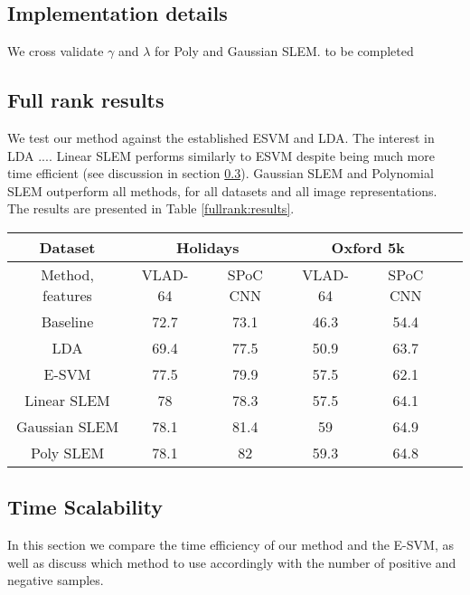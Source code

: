 \subsection{Implementation details}
We cross validate $\gamma$ and $\lambda$ for Poly and Gaussian SLEM. to be completed


\subsection{Full rank results}
We test our method against the established ESVM and LDA. The interest in LDA ....
Linear SLEM performs similarly to ESVM despite being much more time efficient (see discussion in section \ref{time-scale}). Gaussian SLEM and Polynomial SLEM outperform all methods, for all datasets and all image representations. 
The results are presented in Table \ref{fullrank:results}.

\begin{table*}[t]
\begin{center}
\begin{tabular}{|c|c|c|c|c|c|}
\hline
Dataset & \multicolumn{2}{|c|}{\textbf{Holidays}} & \multicolumn{2}{|c|}{\textbf{Oxford 5k}}\\
\hline
Method, features & VLAD-64 \cite{VLAD} & SPoC CNN \cite{babenko15} & VLAD-64 & SPoC CNN \\
\hline\hline
Baseline            & 72.7  & 73.1 & 46.3 & 54.4\\
LDA                 & 69.4 & 77.5 & 50.9  & 63.7\\
E-SVM               & 77.5 & 79.9 & 57.5  & 62.1\\
Linear SLEM         & 78   & 78.3 & 57.5  & 64.1\\
Gaussian SLEM       & 78.1 & 81.4 & 59    & 64.9\\
Poly SLEM           & 78.1 &  82  & 59.3  & 64.8\\
\hline
\end{tabular}
\end{center}
\caption{Mean average precision results for INRIA Holidays and Oxford buildings datasets, expressed as percentages.}
\label{fullrank:results}
\end{table*}

\subsection{Time Scalability} \label{time-scale}
In this section we compare the time efficiency of our method and the E-SVM, as well as discuss which method to use accordingly with the number of positive and negative samples.

